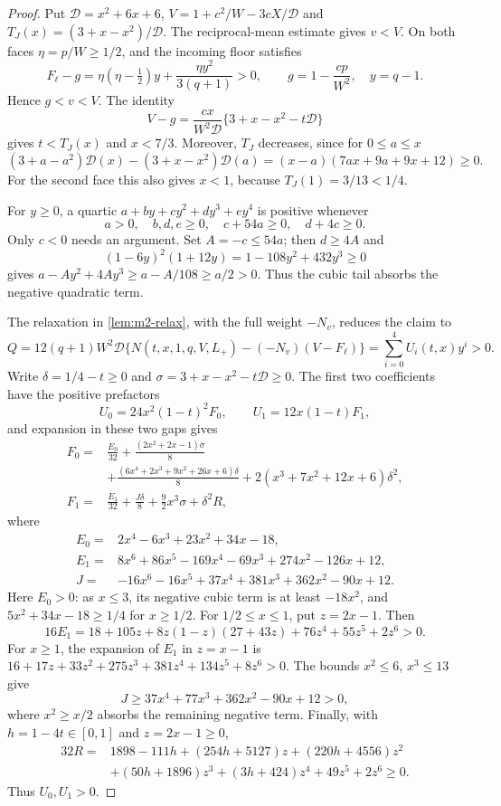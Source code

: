 \begin{proof}
Put $\mathcal D=x^2+6x+6$, $V=1+c^2/W-3cX/\mathcal D$ and
$T_J(x)=(3+x-x^2)/\mathcal D$. The reciprocal-mean estimate gives $v<V$.
On both faces $\eta=p/W\ge1/2$, and the incoming floor satisfies
\[
 F_\ell-g=\eta(\eta-\tfrac12)y+
             \frac{\eta y^2}{3(q+1)}>0,
 \qquad g=1-\frac{cp}{W^2},\quad y=q-1.
\]
Hence $g<v<V$. The identity
\[
 V-g=\frac{cx}{W^2\mathcal D}
       \{3+x-x^2-t\mathcal D\}
\]
gives $t<T_J(x)$ and $x<7/3$. Moreover, $T_J$ decreases, since for $0\le a\le x$
\[
 (3+a-a^2)\mathcal D(x)-(3+x-x^2)\mathcal D(a)
 =(x-a)(7ax+9a+9x+12)\ge0.
\]
For the second face this also gives $x<1$, because $T_J(1)=3/13<1/4$.

For $y\ge0$, a quartic $a+by+cy^2+dy^3+ey^4$ is positive whenever
\[
 a>0,\quad b,d,e\ge0,\quad c+54a\ge0,\quad d+4c\ge0.
\]
Only $c<0$ needs an argument. Set $A=-c\le54a$; then $d\ge4A$ and
\[
 (1-6y)^2(1+12y)=1-108y^2+432y^3\ge0
\]
gives $a-Ay^2+4Ay^3\ge a-A/108\ge a/2>0$.
Thus the cubic tail absorbs the negative quadratic term.

The relaxation in \cref{lem:m2-relax}, with the full weight $-N_v$, reduces the claim to
\[
 Q=12(q+1)W^2\mathcal D
       \{N(t,x,1,q,V,L_+)-(-N_v)(V-F_\ell)\}
   =\sum_{i=0}^4U_i(t,x)y^i>0.
\]
Write $\delta=1/4-t\ge0$ and $\sigma=3+x-x^2-t\mathcal D\ge0$.
The first two coefficients have the positive prefactors
\[
 U_0=24x^2(1-t)^2F_0,\qquad U_1=12x(1-t)F_1,
\]
and expansion in these two gaps gives
\begin{align*}
 F_0={}&\frac{E_0}{32}+\frac{(2x^2+2x-1)\sigma}{8}\\
       &+\frac{(6x^4+2x^3+9x^2+26x+6)\delta}{8}
       +2(x^3+7x^2+12x+6)\delta^2,\\
 F_1={}&\frac{E_1}{32}+\frac{J\delta}{8}
                 +\frac92x^3\sigma+\delta^2R,
\end{align*}
where
\begin{align*}
 E_0={}&2x^4-6x^3+23x^2+34x-18,\\
 E_1={}&8x^6+86x^5-169x^4-69x^3+274x^2-126x+12,\\
 J={}&-16x^6-16x^5+37x^4+381x^3+362x^2-90x+12.
\end{align*}
Here $E_0>0$: as $x\le3$, its negative cubic term is at least $-18x^2$, and
$5x^2+34x-18\ge1/4$ for $x\ge1/2$.
For $1/2\le x\le1$, put $z=2x-1$. Then
\[
 16E_1=18+105z+8z(1-z)(27+43z)+76z^4+55z^5+2z^6>0.
\]
For $x\ge1$, the expansion of $E_1$ in $z=x-1$ is
$16+17z+33z^2+275z^3+381z^4+134z^5+8z^6>0$.
The bounds $x^2\le6$, $x^3\le13$ give
\[
 J\ge37x^4+77x^3+362x^2-90x+12>0,
\]
where $x^2\ge x/2$ absorbs the remaining negative term.
Finally, with $h=1-4t\in[0,1]$ and $z=2x-1\ge0$,
\begin{align*}
 32R={}&1898-111h+(254h+5127)z+(220h+4556)z^2\\
       &+(50h+1896)z^3+(3h+424)z^4+49z^5+2z^6\ge0.
\end{align*}
Thus $U_0,U_1>0$.


\end{proof}
